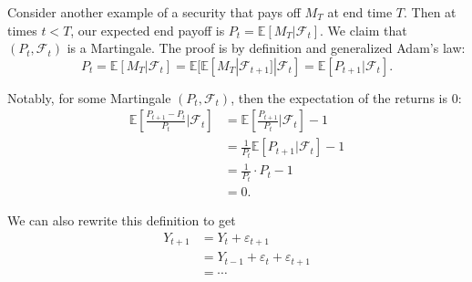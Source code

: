 \documentclass[12pt]{report}
\begin{document}
Consider another example of a security that pays off $M_T$ at end time $T$. Then at times $t<T$, our expected end payoff is $P_t=\mathbb E[M_T|\mathcal F_t]$. We claim that $(P_t,\mathcal F_t)$ is a Martingale. The proof is by definition and generalized Adam's law: $$ P_t = \mathbb E[M_T|\mathcal F_t] = \mathbb E[\mathbb E[M_T|\mathcal F_{t+1}]|\mathcal F_t] = \mathbb E[P_{t+1}|\mathcal F_t]. $$ 

Notably, for some Martingale $(P_t,\mathcal F_t)$, then the expectation of the returns is 0: \begin{align*}
\mathbb E \left[ \frac{P_{t+1}-P_t}{P_t}\bigg\rvert\mathcal F_t \right]  &= \mathbb E \left[ \frac{P_{t+1}}{P_t}\bigg\rvert\mathcal F_t \right] - 1 \\
																		 &= \frac{1}{P_t}\mathbb E[P_{t+1}|\mathcal F_t] - 1 \\
																		 &= \frac{1}{P_t}\cdot P_t - 1 \\
																		 &= 0.
\end{align*} 


We can also rewrite this definition to get \begin{align*}
	Y_{t+1} &= Y_t + \varepsilon_{t+1} \\ 
			&= Y_{t-1} + \varepsilon_t + \varepsilon_{t+1} \\
			&= \cdots
\end{align*} 
\end{document}
